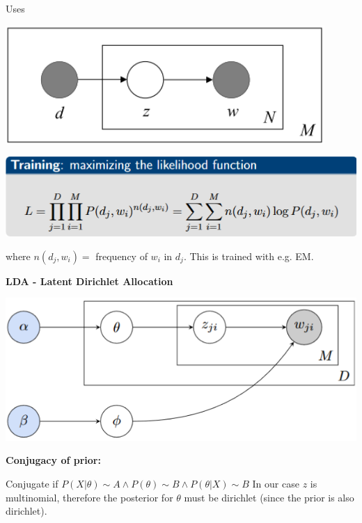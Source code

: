 \documentclass[a4paper,10pt,landscape]{article}
\newenvironment{Figure}
  {\par\medskip\noindent\minipage{\linewidth}}
  {\endminipage\par\medskip}
\begin{document}
\begin{multicols}{3}
Uses 
\begin{Figure}
    \centering
    \includegraphics[width=\linewidth]{images/pLSA.png}
    \label{fig:my_label}
\end{Figure}
\begin{Figure}
    \centering
    \includegraphics[width=\linewidth]{images/pLSATrain.png}
    \label{fig:my_label}
\end{Figure}
where $n(d_j,w_i) =$ frequency of $w_i\text{ in } d_j$. This is trained with e.g. EM. 

\begin{center}
{\Large \textbf{LDA - Latent Dirichlet Allocation} \par}
\end{center}

\begin{Figure}
    \centering
    \includegraphics[width=\linewidth]{images/LDA.png}
    \label{fig:my_label}
\end{Figure}

\textbf{Conjugacy of prior:}

Conjugate if $P(X|\theta) \sim A \land P(\theta) \sim B \land P(\theta|X)\sim B$
In our case $z$  is multinomial, therefore the posterior for $\theta$ must be dirichlet (since the prior is also dirichlet).


\end{multicols}
\end{document}
